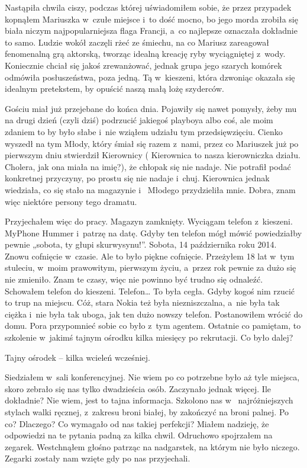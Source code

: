 Nastąpiła chwila ciszy, podczas której uświadomiłem sobie, że przez przypadek kopnąłem Mariuszka w~czułe miejsce i~to 
dość mocno, bo jego morda zrobiła się biała niczym najpopularniejsza flaga Francji, a~co najlepsze oznaczała 
dokładnie to samo. Ludzie wokół zaczęli rżeć ze śmiechu, na co Mariusz zareagował fenomenalną grą aktorską, tworząc 
idealną kreację ryby wyciągniętej z~wody. Koniecznie chciał się jakoś zrewanżować, jednak grupa jego szarych komórek 
odmówiła posłuszeństwa, poza jedną. Tą w~kieszeni, która dzwoniąc okazała się idealnym pretekstem, by opuścić naszą 
małą lożę szyderców. 

Gościu miał już przejebane do końca dnia. Pojawiły się nawet pomysły, żeby mu na drugi dzień (czyli dziś) podrzucić 
jakiegoś playboya albo coś, ale moim zdaniem to by było słabe i~nie wziąłem udziału tym przedsięwzięciu. Cienko 
wyszedł na tym Młody, który śmiał się razem z~nami, przez co Mariuszek już po pierwszym dniu stwierdził Kierownicy (
Kierownica to nasza kierowniczka działu. Cholera, jak ona miała na imię?), że chłopak się nie nadaje. Nie potrafił 
podać konkretnej przyczyny, po prostu się nie nadaje i~chuj. Kierownica jednak wiedziała, co się stało na magazynie i~
Młodego przydzieliła mnie. Dobra, znam więc niektóre persony tego dramatu.

Przyjechałem więc do pracy. Magazyn zamknięty. Wyciągam telefon z~kieszeni. MyPhone Hummer i~patrzę na datę. Gdyby 
ten telefon mógł mówić powiedziałby pewnie „sobota, ty głupi skurwysynu!”. Sobota, 14 października roku 2014. Znowu 
cofnięcie w~czasie. Ale to było piękne cofnięcie. Przeżyłem 18 lat w~tym stuleciu, w~moim prawowitym, pierwszym 
życiu, a~przez rok pewnie za dużo się nie zmieniło. Znam te czasy, więc nie powinno być trudno się odnaleźć. 
Schowałem telefon do kieszeni. Telefon… To była cegła. Gdyby kogoś nim rzucić to trup na miejscu. Cóż, stara Nokia 
też była niezniszczalna, a~nie była tak ciężka i~nie była tak uboga, jak ten dużo nowszy telefon. Postanowiłem wrócić 
do domu. Pora przypomnieć sobie co było z~tym agentem. Ostatnie co pamiętam, to szkolenie w~jakimś tajnym ośrodku 
kilka miesięcy po rekrutacji. Co było dalej?

Tajny ośrodek -- kilka wcieleń wcześniej.

Siedziałem w~sali konferencyjnej. Nie wiem po co potrzebne było aż tyle miejsca, skoro zebrało się nas tylko 
dwadzieścia osób. Zaczynało jednak więcej. Ile dokładnie? Nie wiem, jest to tajna informacja. Szkolono nas w~
najróżniejszych stylach walki ręcznej, z~zakresu broni białej, by zakończyć na broni palnej. Po co? Dlaczego? Co 
wymagało od nas takiej perfekcji? Miałem nadzieję, że odpowiedzi na te pytania padną za kilka chwil. Odruchowo 
spojrzałem na zegarek. Westchnąłem głośno patrząc na nadgarstek, na którym nie było niczego. Zegarki zostały nam 
wzięte gdy po nas przyjechali.

